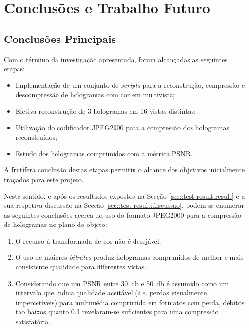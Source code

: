 \chapter{Conclusões e Trabalho Futuro}
\label{ch::conclusao}

\section{Conclusões Principais}
\label{sec::conclusao:principal}

Com o término da investigação apresentada, foram alcançadas as seguintes etapas:
\begin{itemize}
    \item Implementação de um conjunto de \textit{scripts} para a reconstrução, compressão e descompressão de hologramas com cor em multivista;
    \item Efetiva reconstrução de 3 hologramas em 16 vistas distintas;
    \item Utilização do codificador JPEG2000 para a compressão dos hologramas reconstruídos;
    \item Estudo dos hologramas comprimidos com a métrica \ac{PSNR}.
\end{itemize}

A frutífera conclusão destas etapas permitiu o alcance dos objetivos inicialmente traçados para este projeto.

Neste sentido, e após os resultados expostos na Secção \ref{sec::test-result:result} e a sua respetiva discussão na Secção \ref{sec::test-result:discussao}, podem-se enumerar as seguintes conclusões acerca do uso do formato JPEG2000 para a compressão de hologramas no plano do objeto:

\begin{enumerate}
    \item O recurso à transformada de cor não é desejável;
    \item O uso de maiores \textit{bitrates} produz hologramas comprimidos de melhor e mais consistente qualidade para diferentes vistas.
    \item Considerando que um \ac{PSNR} entre \SI{30}{\decibel} e \SI{50}{\decibel} é assumido como um intervalo que indica qualidade aceitável (\textit{i.e.} perdas visualmente impercetíveis) para multimédia comprimida em formatos com perda\cite{welstead1999fractal,barni2006document}, débitos tão baixos quanto \SI{0.3}{} revelaram-se suficientes para uma compressão satisfatória.
\end{enumerate}

